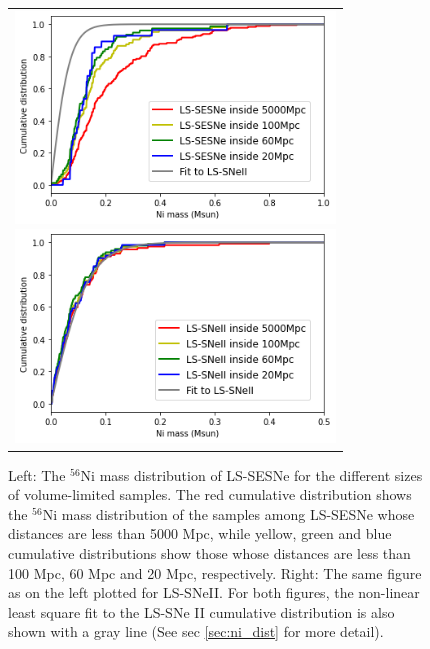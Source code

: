 \documentclass[twocolumn, linenumbers]{aastex62}
\begin{document}
\begin{figure}[htbp]
 \begin{center}
    \begin{tabular}{c}
    \begin{minipage}{0.5\hsize}
    \begin{center}
      \includegraphics[width=85mm]{Ni_dist_different_d_cut_SESNe.png}
    \end{center}
  \end{minipage}
  \begin{minipage}{0.5\hsize}
    \begin{center}
       \includegraphics[width=85mm]{Ni_dist_different_d_cut_SNeII.png}
    \end{center}
  \end{minipage}
  \end{tabular}
 \end{center}
 \caption{
 Left: The $^{56}$Ni mass distribution of LS-SESNe for the different sizes of volume-limited samples. The red cumulative distribution shows the $^{56}$Ni mass distribution of the samples among LS-SESNe whose distances are less than 5000 Mpc, while yellow, green and blue cumulative distributions show those whose distances are less than 100 Mpc, 60 Mpc and 20 Mpc, respectively. Right: The same figure as on the left plotted for LS-SNeII. For both figures, the non-linear least square fit to the LS-SNe II cumulative distribution is also shown with a gray line (See sec \ref{sec:ni_dist} for more detail).
 }
  \label{Ni_dist_different_d_cut}
\end{figure}
\end{document}
